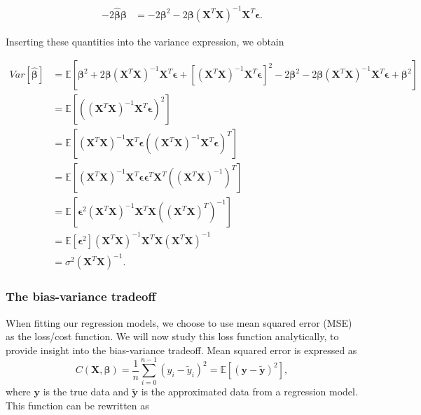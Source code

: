 \documentclass[12pt]{article}
\begin{document}
\begin{align}
    -2\hat{\boldsymbol{\beta}} \boldsymbol{\beta} &= -2\boldsymbol{\beta}^2 - 2\boldsymbol{\beta}\left(\mathbf{X}^T \mathbf{X} \right)^{-1} \mathbf{X}^T \boldsymbol{\epsilon}.
\end{align}

Inserting these quantities into the variance expression, we obtain

\begin{align}
    Var \left[\hat{\boldsymbol{\beta}} \right] &= \mathbb{E} \left[ \boldsymbol{\beta}^2 +2\boldsymbol{\beta}\left( \mathbf{X}^T \mathbf{X} \right)^{-1} \mathbf{X}^T \boldsymbol{\epsilon} + \left[\left( \mathbf{X}^T \mathbf{X} \right)^{-1} \mathbf{X}^T \boldsymbol{\epsilon}\right]^2 -2\boldsymbol{\beta}^2 - 2\boldsymbol{\beta}\left(\mathbf{X}^T \mathbf{X} \right)^{-1} \mathbf{X}^T \boldsymbol{\epsilon} + \boldsymbol{\beta}^2 \right] \nonumber\nonumber \\
    &= \mathbb{E} \left[ \left(\left( \mathbf{X}^T \mathbf{X} \right)^{-1} \mathbf{X}^T \boldsymbol{\epsilon}\right)^2 \right] \nonumber\nonumber \\
    &= \mathbb{E} \left[ \left( \mathbf{X}^T \mathbf{X} \right)^{-1} \mathbf{X}^T \boldsymbol{\epsilon} \left( \left( \mathbf{X}^T \mathbf{X} \right)^{-1} \mathbf{X}^T \boldsymbol{\epsilon}\right)^T \right] \nonumber\nonumber \\
    &= \mathbb{E} \left[ \left( \mathbf{X}^T \mathbf{X} \right)^{-1} \mathbf{X}^T \boldsymbol{\epsilon} \boldsymbol{\epsilon}^T \mathbf{X}^T \left(\left(\mathbf{X}^T \mathbf{X} \right)^{-1}\right)^T \right] \nonumber\nonumber \\
    &= \mathbb{E} \left[ \boldsymbol{\epsilon}^2 \left( \mathbf{X}^T \mathbf{X} \right)^{-1} \mathbf{X}^T \mathbf{X} \left(\left(\mathbf{X}^T \mathbf{X} \right)^T\right)^{-1} \right] \nonumber\nonumber \\
    &= \mathbb{E} \left[ \boldsymbol{\epsilon}^2 \right] \left( \mathbf{X}^T \mathbf{X} \right)^{-1}  \mathbf{X}^T \mathbf{X} \left( \mathbf{X}^T \mathbf{X} \right)^{-1} \nonumber\nonumber \\
    &= \sigma^2 \left( \mathbf{X}^T \mathbf{X} \right)^{-1}.
\end{align}


\subsubsection{The bias-variance tradeoff}
When fitting our regression models, we choose to use mean squared error (MSE) as the loss/cost function. We will now study this loss function analytically, to provide insight into the bias-variance tradeoff. Mean squared error is expressed as
\begin{equation}
    C\left(\mathbf{X}, \boldsymbol{\beta}\right) = \frac{1}{n} \sum_{i=0}^{n-1} \left(y_i - \tilde{y}_i\right)^2 = \mathbb{E} \left[ \left( \mathbf{y} - \mathbf{\tilde{y}} \right)^2 \right],
\end{equation}
where $\boldsymbol{y}$ is the true data and $\tilde{\boldsymbol{y}}$ is the approximated data from a regression model.
This function can be rewritten as
\end{document}
